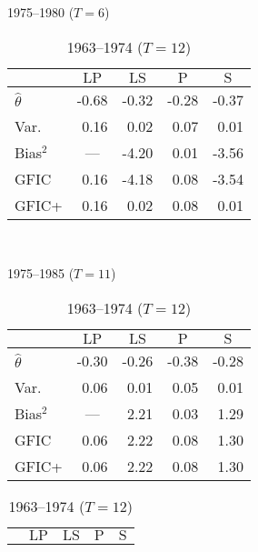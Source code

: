 \begin{table}[h]
  \centering
    \begin{subtable}[h]{0.45\textwidth}
        \centering
     \caption{1975--1980 ($T=6$)}
     \label{tab:cigarettesShortappend}
     \begin{tabular}{lrrrr}\hline\hline 
         & \multicolumn{1}{c}{$\text{LP}$} & \multicolumn{1}{c}{$\text{LS}$} 
          & \multicolumn{1}{c}{$\text{P}$} & \multicolumn{1}{c}{$\text{S}$}\\
        \hline
        $\widehat{\theta}$ & -0.68 & -0.32 &  -0.28 &  -0.37\\
        Var.\ & 0.16 &  0.02 & 0.07 & 0.01\\ 
        Bias$^2$ & \multicolumn{1}{c}{---} & -4.20 & 0.01 & -3.56 \\
        GFIC  & 0.16 & -4.18 & 0.08  & -3.54  \\
        GFIC+  & 0.16 &  0.02 & 0.08  & 0.01    \\
        \hline
      \end{tabular}
    \end{subtable}
    ~
    \begin{subtable}[h]{0.45\textwidth}
      \centering
     \caption{1975--1985 ($T=11$)}
     \label{tab:cigarettesLongappend}
     \begin{tabular}{lrrrr}\hline\hline 
         & \multicolumn{1}{c}{$\text{LP}$} & \multicolumn{1}{c}{$\text{LS}$} 
          & \multicolumn{1}{c}{$\text{P}$} & \multicolumn{1}{c}{$\text{S}$}\\
        \hline
        $\widehat{\theta}$ & -0.30 & -0.26 &  -0.38 &  -0.28\\
        Var.\ & 0.06 & 0.01 & 0.05 & 0.01\\ 
        Bias$^2$ & \multicolumn{1}{c}{---} & 2.21 & 0.03 & 1.29\\
        GFIC  &0.06 & 2.22 & 0.08 &  1.30\\
        GFIC+  & 0.06 & 2.22 & 0.08  & 1.30  \\
           \hline
      \end{tabular}     
    \end{subtable}
     \begin{subtable}[h]{0.45\textwidth}
        \centering
     \caption{1963--1974 ($T=12$)}
     \label{tab:cigarettesLongerappend}
     \begin{tabular}{lrrrr}\hline\hline 
         & \multicolumn{1}{c}{$\text{LP}$} & \multicolumn{1}{c}{$\text{LS}$} 
          & \multicolumn{1}{c}{$\text{P}$} & \multicolumn{1}{c}{$\text{S}$}\\

\end{tabular}
\end{subtable}
\end{table}
